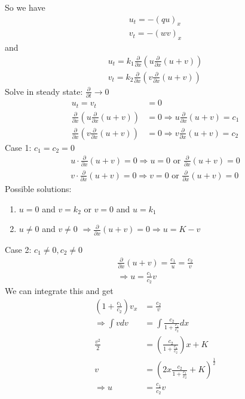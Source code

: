 \documentclass[12pt, letterpaper]{article}
\begin{document}
So we have 
\begin{align*}
    u_t = - (qu)_x \\
    v_t = - (wv)_x
\end{align*}
and 
\begin{align*}
    u_t = k_1 \frac{\partial}{\partial x}\left(u \frac{\partial}{\partial x}(u+v)\right)\\
    v_t = k_2 \frac{\partial}{\partial x}\left(v \frac{\partial}{\partial x}(u+v)\right)
\end{align*}
Solve in steady state: $\frac{\partial}{\partial t} \rightarrow 0$
\begin{align*}
    u_t = v_t &= 0 \\
    \frac{\partial}{\partial x}\left(u\frac{\partial}{\partial x}(u+v)\right) &= 0 
    \Rightarrow u \frac{\partial}{\partial x}(u+v) = c_1 \\
    \frac{\partial}{\partial x}\left(v\frac{\partial}{\partial x}(u+v)\right) &= 0 
    \Rightarrow v \frac{\partial}{\partial x}(u+v) = c_2
\end{align*}
Case 1: $c_1 = c_2 = 0$
\begin{align*}
    u\cdot \frac{\partial}{\partial x}(u+v) = 0 \Rightarrow u = 0 \text{ or } \frac{\partial}{\partial x}(u+v) = 0 \\
    v\cdot \frac{\partial}{\partial x}(u+v) = 0 \Rightarrow v = 0 \text{ or } \frac{\partial}{\partial x}(u+v) = 0
\end{align*}
Possible solutions: 
\begin{enumerate}
    \item[1a)] $u = 0$ and $v = k_2$ or $v = 0$ and $u = k_1$
    \item[2a)] $u \ne 0$ and $v\ne 0$ $\Rightarrow \frac{\partial}{\partial x}(u+v) = 0 \Rightarrow u = K - v$
\end{enumerate}
Case 2: $c_1 \ne 0, c_2 \ne 0$
\begin{align*}
    \frac{\partial}{\partial x} (u+v) = \frac{c_1}{u} = \frac{c_2}{v} \\
    \Rightarrow u = \frac{c_1}{c_2} v 
\end{align*}
We can integrate this and get 
\begin{align*}
    \left(1+ \frac{c_1}{c_2}\right)v_x &= \frac{c_2}{v} \\
    \Rightarrow \int vdv &= \int \frac{c_2}{1 + \frac{c_1}{c_2}} dx \\
    \frac{v^2}{2} &= \left(\frac{c_2}{1+\frac{c_1}{c_2}}\right) x + K \\
    v &= \left( 2x \frac{c_2}{1 + \frac{c_1}{c_2}} + K \right)^\frac 12 \\
    \Rightarrow u &= \frac{c_1}{c_2} v
\end{align*}
\end{document}
